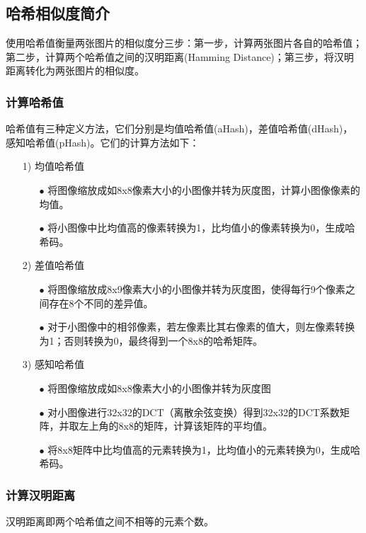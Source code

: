\subsection{哈希相似度简介}
使用哈希值衡量两张图片的相似度分三步：第一步，计算两张图片各自的哈希值；第二步，计算两个哈希值之间的汉明距离(Hamming Distance)；第三步，将汉明距离转化为两张图片的相似度。
\subsubsection{计算哈希值}
哈希值有三种定义方法，它们分别是均值哈希值(aHash)，差值哈希值(dHash)，感知哈希值(pHash)。它们的计算方法如下：
\begin{itemize}
	\item [1)]
	均值哈希值
	\begin{itemize}
		\item [$\bullet$]将图像缩放成如8x8像素大小的小图像并转为灰度图，计算小图像像素的均值。
		\item [$\bullet$]将小图像中比均值高的像素转换为1，比均值小的像素转换为0，生成哈希码。
	\end{itemize}
	
	\item [2)]
	差值哈希值
	\begin{itemize}
		\item [$\bullet$]将图像缩放成8x9像素大小的小图像并转为灰度图，使得每行9个像素之间存在8个不同的差异值。
		\item [$\bullet$]对于小图像中的相邻像素，若左像素比其右像素的值大，则左像素转换为1；否则转换为0，最终得到一个8x8的哈希矩阵。
	\end{itemize}

	\item [3)]
	感知哈希值
	\begin{itemize}
		\item [$\bullet$]将图像缩放成如8x8像素大小的小图像并转为灰度图
		\item [$\bullet$]对小图像进行32x32的DCT（离散余弦变换）得到32x32的DCT系数矩阵，并取左上角的8x8的矩阵，计算该矩阵的平均值。
		\item [$\bullet$]将8x8矩阵中比均值高的元素转换为1，比均值小的元素转换为0，生成哈希码。
	\end{itemize}
	
\end{itemize}

\subsubsection{计算汉明距离}
汉明距离即两个哈希值之间不相等的元素个数。


